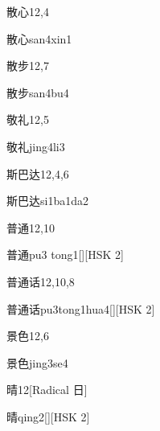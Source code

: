 \begin{entry}{散心}{12,4}
  \begin{phonetics}{散心}{san4xin1}
  \end{phonetics}
\end{entry}

\begin{entry}{散步}{12,7}
  \begin{phonetics}{散步}{san4bu4}
  \end{phonetics}
\end{entry}

\begin{entry}{敬礼}{12,5}
  \begin{phonetics}{敬礼}{jing4li3}
  \end{phonetics}
\end{entry}

\begin{entry}{斯巴达}{12,4,6}
  \begin{phonetics}{斯巴达}{si1ba1da2}
  \end{phonetics}
\end{entry}

\begin{entry}{普通}{12,10}
  \begin{phonetics}{普通}{pu3 tong1}[][HSK 2]
  \end{phonetics}
\end{entry}

\begin{entry}{普通话}{12,10,8}
  \begin{phonetics}{普通话}{pu3tong1hua4}[][HSK 2]
  \end{phonetics}
\end{entry}

\begin{entry}{景色}{12,6}
  \begin{phonetics}{景色}{jing3se4}
  \end{phonetics}
\end{entry}

\begin{entry}{晴}{12}[Radical 日]
  \begin{phonetics}{晴}{qing2}[][HSK 2]
  \end{phonetics}
\end{entry}

